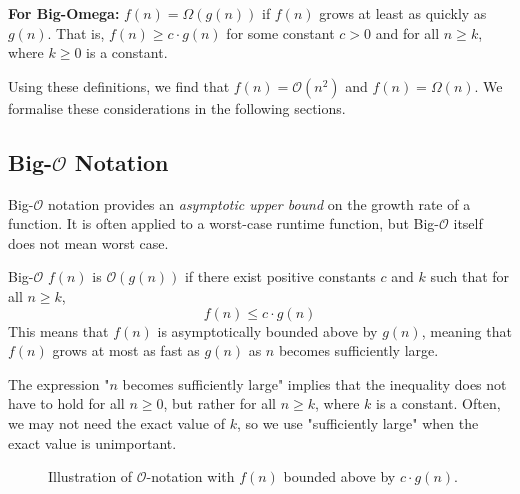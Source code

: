 \textbf{For Big-Omega:} \( f(n) = \Omega(g(n)) \) if \( f(n) \) grows at least as quickly as \( g(n) \). That is, \( f(n) \geq c \cdot g(n) \) for some constant \( c > 0 \) and for all \( n \geq k \), where \( k \geq 0 \) is a constant.

Using these definitions, we find that \( f(n) = \mathcal{O}(n^2) \) and \( f(n) = \Omega(n) \). We formalise these considerations in the following sections.

\subsection*{Big-\texorpdfstring{$\mathcal{O}$}{O} Notation}
Big-$\mathcal{O}$ notation provides an \textit{asymptotic upper bound} on the growth rate of a function. It is often applied to a worst-case runtime function, but Big-$\mathcal{O}$ itself does not mean worst case.

\begin{definition}{Big-$\mathcal{O}$}
    $f(n)$ is $\mathcal{O}(g(n))$ if there exist positive constants $c$ and $k$ such that for all $n \geq k$,
    \medskip
    \[
    f(n) \leq c \cdot g(n)
    \]
    \medskip
    This means that $f(n)$ is asymptotically bounded above by $g(n)$, meaning that $f(n)$ grows at most as fast as $g(n)$ as $n$ becomes sufficiently large.
    \label{def:big_o_notation}
\end{definition}

The expression "$n$ becomes sufficiently large" implies that the inequality does not have to hold for all $n \geq 0$, but rather for all $n \geq k$, where $k$ is a constant. Often, we may not need the exact value of $k$, so we use "sufficiently large" when the exact value is unimportant.

\begin{figure}[htbp]
    \centering
    \caption{Illustration of \(\mathcal{O}\)-notation with $f(n)$ bounded above by $c \cdot g(n)$.}
    \label{fig:big_o_notation}
\end{figure}

